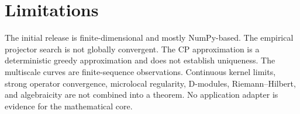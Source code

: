\section{Limitations}

The initial release is finite-dimensional and mostly NumPy-based. The empirical projector search is not globally convergent. The CP approximation is a deterministic greedy approximation and does not establish uniqueness. The multiscale curves are finite-sequence observations. Continuous kernel limits, strong operator convergence, microlocal regularity, D-modules, Riemann--Hilbert, and algebraicity are not combined into a theorem. No application adapter is evidence for the mathematical core.



